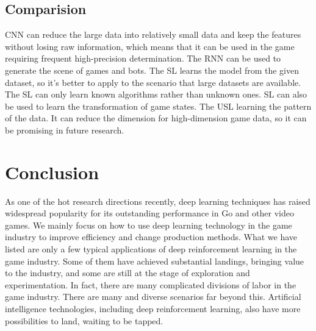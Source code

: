 \documentclass[11pt,en]{elegantpaper}
\begin{document}
\subsection{Comparision}
CNN can reduce the large data into relatively small data and keep the features without losing raw information, which means that it can be used in the game requiring frequent high-precision determination. The RNN can be used to generate the scene of games and bots. The SL learns the model from the given dataset, so it's better to apply to the scenario that large datasets are available. The SL can only learn known algorithms rather than unknown ones. SL can also be used to learn the transformation of game states. The USL learning the pattern of the data. It can reduce the dimension for high-dimension game data, so it can be promising in future research. 

\section{Conclusion}
As one of the hot research directions recently, deep learning techniques has raised widespread popularity for its outstanding performance in Go and other video games. We mainly focus on how to use deep learning technology in the game industry to improve efficiency and change production methods. What we have listed are only a few typical applications of deep reinforcement learning in the game industry. Some of them have achieved substantial landings, bringing value to the industry, and some are still at the stage of exploration and experimentation. In fact, there are many complicated divisions of labor in the game industry. There are many and diverse scenarios far beyond this. Artificial intelligence technologies, including deep reinforcement learning, also have more possibilities to land, waiting to be tapped.


\end{document}
